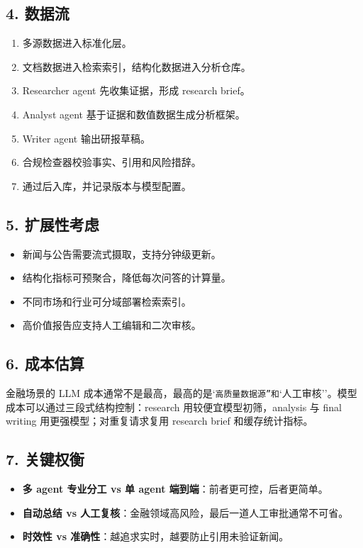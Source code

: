 \subsection{4. 数据流}
\begin{enumerate}[leftmargin=2em]
\item 多源数据进入标准化层。
\item 文档数据进入检索索引，结构化数据进入分析仓库。
\item Researcher agent 先收集证据，形成 research brief。
\item Analyst agent 基于证据和数值数据生成分析框架。
\item Writer agent 输出研报草稿。
\item 合规检查器校验事实、引用和风险措辞。
\item 通过后入库，并记录版本与模型配置。
\end{enumerate}

\subsection{5. 扩展性考虑}
\begin{itemize}[leftmargin=2em]
\item 新闻与公告需要流式摄取，支持分钟级更新。
\item 结构化指标可预聚合，降低每次问答的计算量。
\item 不同市场和行业可分域部署检索索引。
\item 高价值报告应支持人工编辑和二次审核。
\end{itemize}

\subsection{6. 成本估算}
金融场景的 LLM 成本通常不是最高，最高的是`\texttt{高质量数据源''和}`人工审核''。模型成本可以通过三段式结构控制：research 用较便宜模型初筛，analysis 与 final writing 用更强模型；对重复请求复用 research brief 和缓存统计指标。


\subsection{7. 关键权衡}
\begin{itemize}[leftmargin=2em]
\item \textbf{多 agent 专业分工 vs 单 agent 端到端}：前者更可控，后者更简单。
\item \textbf{自动总结 vs 人工复核}：金融领域高风险，最后一道人工审批通常不可省。
\item \textbf{时效性 vs 准确性}：越追求实时，越要防止引用未验证新闻。
\end{itemize}

